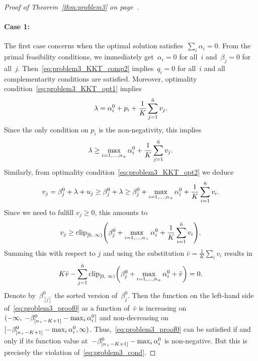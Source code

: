 \begin{proof}[Proof of Theorem~\ref{thm:problem3} on page~\pageref{thm:problem3}]
  \paragraph*{Case 1:} The first case concerns when the optimal solution satisfies~$\sum_i  \alpha_i = 0$. From the primal feasibility conditions, we immediately get~$\alpha_i = 0$ for all~$i$ and~$\beta_j = 0$ for all~$j$. Then~\eqref{eq:problem3_KKT_comp2} implies~$q_i = 0$ for all~$i$ and all complementarity conditions are satisfied. Moreover, optimality condition~\eqref{eq:problem3_KKT_opt1} implies
  \begin{equation*}
    \lambda = \alpha_i^0 + p_i + \frac{1}{K} \sum_{j = 1}^{\tilde{n}} v_j.
  \end{equation*}
  Since the only condition on $p_i$ is the non-negativity, this implies
  \begin{equation*}
    \lambda \ge \max_{i=1, \ldots, n_{+}} \alpha_i^0 + \frac{1}{K} \sum_{j = 1}^{\tilde{n}} v_j.
  \end{equation*}
  Similarly, from optimality condition~\eqref{eq:problem3_KKT_opt2} we deduce
  \begin{equation*}
    v_j
      = \beta_j^0 + \lambda + u_j
      \ge \beta_j^0 + \lambda
      \ge \beta_j^0 + \max_{i=1,\dots,n_{+}} \alpha_i^0 + \frac{1}{K} \sum_{i = 1}^{\tilde{n}} v_i.
  \end{equation*}
  Since we need to fulfill $v_j \ge 0$, this amounts to
  \begin{equation*}
    v_j 
      \ge \clip[u]{0}{\infty}{\beta_j^0 + \max_{i=1,\dots,\npos} \alpha_i^0 + \frac{1}{K} \sum_{i = 1}^{\ntil} v_i}.
  \end{equation*}
  Summing this with respect to $j$ and using the substitution $\bar{v} = \frac{1}{K}\sum_i v_i$ results in
  \begin{equation}\label{eq:problem3_proof0}
    K\bar{v} - \sum_{j=1}^{\ntil} \clip[u]{0}{\infty}{\beta_j^0 + \max_{i=1,\dots,\npos} \alpha_i^0 + \bar{v}} = 0.
  \end{equation}
  Denote by~$\beta_{[j]}^0$ the sorted version of~$\beta_j^0$. Then the function on the left-hand side of~\eqref{eq:problem3_proof0} as a function of~$\bar{v}$ is increasing on~$(-\infty, \; -\beta_{[n_{+} - K + 1]}^0 - \max_{i} \alpha_i^0]$ and non-decreasing on~$[- \beta_{[n_{+} - K + 1]}^0 - \max_{i} \alpha_i^0, \infty)$. Thus,~\eqref{eq:problem3_proof0} can be satisfied if and only if its function value at~$- \beta_{[n_{+} - K + 1]}^0 - \max_{i} \alpha_i^0$ is non-negative. But this is precisely the violation of~\eqref{eq:problem3_cond}.
  

\end{proof}
